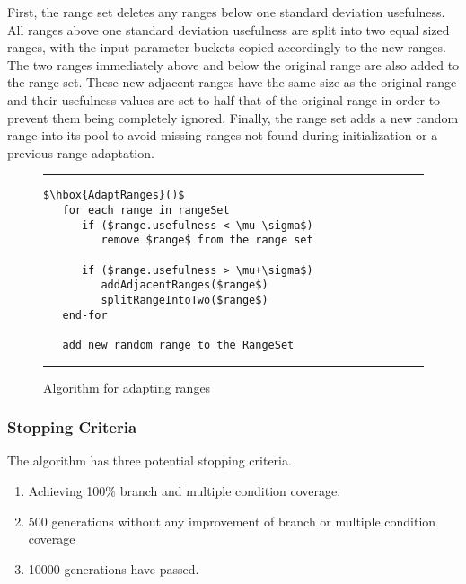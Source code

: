 \documentclass[runningheads]{llncs}
\begin{document}
First, the range set deletes any ranges below one standard deviation usefulness. All ranges above one standard deviation usefulness are split into two equal sized ranges, with the input parameter buckets copied accordingly to the new ranges. The two ranges immediately above and below the original range are also added to the range set. These new adjacent ranges have the same size as the original range and their usefulness values are set to half that of the original range in order to prevent them being completely ignored. Finally, the range set adds a new random range into its pool to avoid missing ranges not found during initialization or a previous range adaptation.

\begin{figure}[h!]
\begin{center}
\hrule
\medskip
\begin{Verbatim}[fontfamily=tt, xleftmargin=10pt, commandchars=\\\{\},
   codes={\catcode`$=3\catcode`^=7\catcode`_=8}]
$\hbox{AdaptRanges}()$    
   for each range in rangeSet
      if ($range.usefulness < \mu-\sigma$)
         remove $range$ from the range set
      
      if ($range.usefulness > \mu+\sigma$)
         addAdjacentRanges($range$)
         splitRangeIntoTwo($range$)  
   end-for
   
   add new random range to the RangeSet
\end{Verbatim}
\hrule
\end{center}
\caption{Algorithm for adapting ranges \label{fig:adptRang}}
\end{figure}
\FloatBarrier

\subsubsection{Stopping Criteria}
The algorithm has three potential stopping criteria. 
\begin{enumerate}
	\item Achieving 100\% branch and multiple condition coverage. 
	\item 500 generations without any improvement of branch or multiple condition coverage
	\item 10000 generations have passed.
\end{enumerate}
\end{document}
